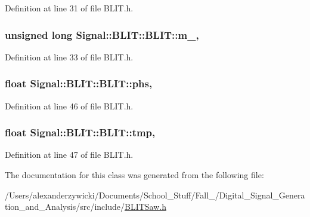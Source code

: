 Definition at line 31 of file B\+L\+I\+T.\+h.

\hypertarget{class_signal_1_1_b_l_i_t_1_1_b_l_i_t_a314aae37a0a53fa3f79a4466b9558fa5}{
\subsubsection[{m\+\_\+}]{\setlength{\rightskip}{0pt plus 5cm}unsigned long Signal\+::\+B\+L\+I\+T\+::\+B\+L\+I\+T\+::m\+\_\+\hspace{0.3cm}{\ttfamily [protected]}, {\ttfamily [inherited]}}}\label{class_signal_1_1_b_l_i_t_1_1_b_l_i_t_a314aae37a0a53fa3f79a4466b9558fa5}


Definition at line 33 of file B\+L\+I\+T.\+h.

\hypertarget{class_signal_1_1_b_l_i_t_1_1_b_l_i_t_afd06bf26696642f7eb400fb984e524f3}{
\subsubsection[{phs}]{\setlength{\rightskip}{0pt plus 5cm}float Signal\+::\+B\+L\+I\+T\+::\+B\+L\+I\+T\+::phs\hspace{0.3cm}{\ttfamily [protected]}, {\ttfamily [inherited]}}}\label{class_signal_1_1_b_l_i_t_1_1_b_l_i_t_afd06bf26696642f7eb400fb984e524f3}


Definition at line 46 of file B\+L\+I\+T.\+h.

\hypertarget{class_signal_1_1_b_l_i_t_1_1_b_l_i_t_aa543d207e6dd260762652221c598bae9}{
\subsubsection[{tmp}]{\setlength{\rightskip}{0pt plus 5cm}float Signal\+::\+B\+L\+I\+T\+::\+B\+L\+I\+T\+::tmp\hspace{0.3cm}{\ttfamily [protected]}, {\ttfamily [inherited]}}}\label{class_signal_1_1_b_l_i_t_1_1_b_l_i_t_aa543d207e6dd260762652221c598bae9}


Definition at line 47 of file B\+L\+I\+T.\+h.



The documentation for this class was generated from the following file\+:\begin{DoxyCompactItemize}
\item 
/\+Users/alexanderzywicki/\+Documents/\+School\+\_\+\+Stuff/\+Fall\+\_/\+Digital\+\_\+\+Signal\+\_\+\+Generation\+\_\+and\+\_\+\+Analysis/src/include/\hyperlink{_b_l_i_t_saw_8h}{B\+L\+I\+T\+Saw.\+h}\end{DoxyCompactItemize}
